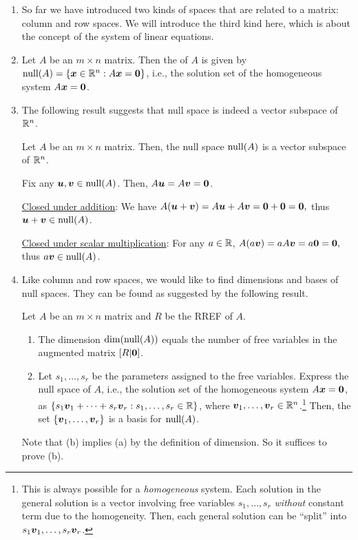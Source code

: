 \begin{enumerate}
\item So far we have introduced two kinds of spaces that are related to a
matrix: column and row spaces. We will introduce the third kind here, which is
about the concept of the system of linear equations.

\item Let \(A\) be an \(m\times n\) matrix. Then the  of \(A\)
is given by \(\operatorname{null}(A)=\{\vb*{x}\in\mathbb{R}^n:A\vb*{x}=\vb*{0}\}\), i.e., the
solution set of the homogeneous system \(A\vb*{x}=\vb*{0}\).

\item The following result suggests that null space is indeed a vector
subspace of \(\mathbb{R}^n\).

\begin{theorem}
\label{thm:null-sp-vec-subsp}
Let \(A\) be an \(m\times n\) matrix. Then, the null space \(\operatorname{null}(A)\) is a
vector subspace of \(\mathbb{R}^n\).
\end{theorem}
\begin{pf}
Fix any \(\vb*{u},\vb*{v}\in \operatorname{null}(A)\). Then, \(A\vb*{u}=A\vb*{v}=\vb*{0}\).

\underline{Closed under addition}: We have
\(A(\vb*{u}+\vb*{v})=A\vb*{u}+A\vb*{v}=\vb*{0}+\vb*{0}=\vb*{0},\) thus
\(\vb*{u}+\vb*{v}\in\operatorname{null}(A)\).

\underline{Closed under scalar multiplication}: For any \(a\in\mathbb{R}\),
\(A(a\vb*{v})=aA\vb*{v}=a\vb*{0}=\vb*{0},\) thus \(a\vb*{v}\in\operatorname{null}(A)\).
\end{pf}

\item Like column and row spaces, we would like to find dimensions and bases of
null spaces. They can be found as suggested by the following result.

\begin{theorem}
\label{thm:null-sp-dim-basis}
Let \(A\) be an \(m\times n\) matrix and \(R\) be the RREF of \(A\).
\begin{enumerate}
\item The dimension \(\dim(\operatorname{null}(A))\) equals the number of free variables in
the augmented matrix \([R|\vb*{0}]\).

\item Let \(s_1,\dotsc,s_r\) be the parameters assigned to the free variables.
Express the null space of \(A\), i.e., the solution set of the homogeneous
system \(A\vb*{x}=\vb*{0}\), as
\(\{s_1\vb*{v}_1+\dotsb+s_r\vb*{v}_r:s_1,\dotsc,s_r\in\mathbb{R}\}\), where
\(\vb*{v}_1,\dotsc,\vb*{v}_r\in\mathbb{R}^n\).\footnote{This is always possible for a
\emph{homogeneous} system. Each solution in the general solution is a vector
involving free variables \(s_1,\dotsc,s_r\) \emph{without} constant term due to
the homogeneity. Then, each general solution can be ``split'' into
\(s_1\vb*{v}_1,\dotsc,s_r\vb*{v}_r\).} Then, the set
\(\{\vb*{v}_1,\dotsc,\vb*{v}_r\}\) is a basis for \(\operatorname{null}(A)\).
\end{enumerate}
\end{theorem}
\begin{pf}
Note that (b) implies (a) by the definition of dimension. So it suffices to
prove (b).


\end{pf}
\end{enumerate}
